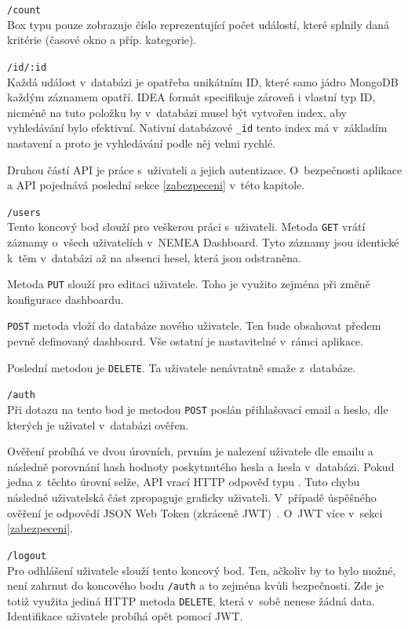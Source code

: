 \begin{description}
    \item \texttt{/count}\\
        Box typu  pouze zobrazuje číslo reprezentující počet událostí, které splnily daná kritérie (časové okno a příp. kategorie).
    
    \item \texttt{/id/:id}\\
        Každá událost v~databázi je opatřeba unikátním ID, které samo jádro MongoDB každým záznamem opatří. IDEA formát specifikuje zároveň i vlastní typ ID, nicméně na tuto položku by v~databázi musel být vytvořen index, aby vyhledávání bylo efektivní. Nativní databázové \texttt{\_id} tento index má v~základím nastavení a proto je vyhledávání podle něj velmi rychlé.

\end{description}

Druhou částí API je práce s~uživateli a jejich autentizace. O~bezpečnosti aplikace a API pojednává poslední sekce \ref{zabezpeceni} v~této kapitole.

\begin{description}
    \item \texttt{/users}\\
        Tento koncový bod slouží pro veškerou práci s~uživateli. Metoda \texttt{GET} vrátí záznamy o~všech uživatelích v~NEMEA Dashboard. Tyto záznamy jsou identické k~těm v~databázi až na absenci hesel, která jsou odstraněna.

        Metoda \texttt{PUT} slouží pro editaci uživatele. Toho je využito zejména při změně konfigurace dashboardu.

        \texttt{POST} metoda vloží do databáze nového uživatele. Ten bude obsahovat předem pevně definovaný dashboard. Vše ostatní je nastavitelné v~rámci aplikace.

        Poslední metodou je \texttt{DELETE}. Ta uživatele nenávratně smaže z~databáze.

    \item \texttt{/auth}\\
        Při dotazu na tento bod je metodou \texttt{POST} poslán přihlašovací email a heslo, dle kterých je uživatel v~databázi ověřen.

        Ověření probíhá ve dvou úrovních, prvním je nalezení uživatele dle emailu a následně porovnání hash hodnoty poskytnutého hesla a hesla v~databázi. Pokud jedna z~těchto úrovní selže, API vrací HTTP odpověď typu . Tuto chybu následně uživatelská část zpropaguje graficky uživateli. V~případě úspěšného ověření je odpovědí JSON Web Token (zkráceně JWT)~\cite{rfc:jwt}. O~JWT více v~sekci \ref{zabezpeceni}.

    \item \texttt{/logout}\\
        Pro odhlášení uživatele slouží tento koncový bod. Ten, ačkoliv by to bylo možné, není zahrnut do koncového bodu \texttt{/auth} a to zejména kvůli bezpečnosti. Zde je totiž využita jediná HTTP metoda \texttt{DELETE}, která v~sobě nenese žádná data. Identifikace uživatele probíhá opět pomocí JWT.
\end{description}


